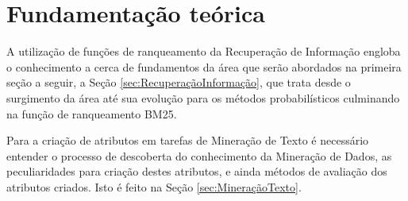 \chapter{Fundamentação teórica} \label{ch:FundamentaçãoTeórica}
    A utilização de funções de ranqueamento da Recuperação de Informação engloba o conhecimento a cerca de fundamentos da área que serão abordados na primeira seção a seguir, a Seção \ref{sec:RecuperaçãoInformação}, que trata desde o surgimento da área até sua evolução para os métodos probabilísticos culminando na função de ranqueamento BM25.

    Para a criação de atributos em tarefas de Mineração de Texto é necessário entender o processo de descoberta do conhecimento da Mineração de Dados, as peculiaridades para criação destes atributos, e ainda métodos de avaliação dos atributos criados. Isto é feito na Seção \ref{sec:MineraçãoTexto}.

    

    \newpage

    
